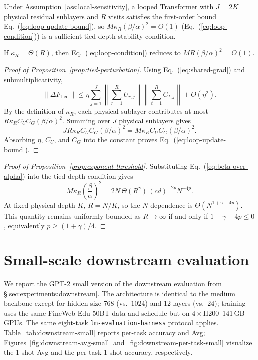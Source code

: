 \documentclass[11pt]{airesearch}
\begin{document}
\begin{proposition}
\label{prop:tied-perturbation}
Under Assumption~\ref{ass:local-sensitivity}, a looped Transformer with
$J=2K$ physical residual sublayers and $R$ visits satisfies the first-order
bound Eq.~(\ref{eq:loop-update-bound}), so
$M\kappa_R(\beta/\alpha)^2=O(1)$ (Eq.~(\ref{eq:loop-condition})) is a sufficient tied-depth stability condition.
\end{proposition}

\begin{corollary}
\label{cor:aligned-loop}
If $\kappa_R=\Theta(R)$, then Eq.~(\ref{eq:loop-condition}) reduces to
$MR(\beta/\alpha)^2 = O(1)$.
\end{corollary}

\begin{proof}[Proof of Proposition~\ref{prop:tied-perturbation}]
Using Eq.~(\ref{eq:shared-grad}) and submultiplicativity,
\[
  \|\Delta F_{\mathrm{tied}}\|
  \le
  \eta\sum_{j=1}^{J}
  \left\|\sum_{r=1}^{R} U_{r,j}\right\|
  \left\|\sum_{t=1}^{R} G_{t,j}\right\|
  +O(\eta^2).
\]
By the definition of $\kappa_R$, each physical sublayer contributes at most
$R\kappa_R C_UC_G(\beta/\alpha)^2$. Summing over $J$ physical sublayers gives
\[
  JR\kappa_R C_UC_G(\beta/\alpha)^2
  =M\kappa_R C_UC_G(\beta/\alpha)^2.
\]
Absorbing $\eta$, $C_U$, and $C_G$ into the constant proves
Eq.~(\ref{eq:loop-update-bound}).
\end{proof}

\begin{proof}[Proof of Proposition~\ref{prop:exponent-threshold}]
Substituting Eq.~(\ref{eq:beta-over-alpha}) into the tied-depth condition gives
\[
  M\kappa_R\left(\frac{\beta}{\alpha}\right)^2
  =2N\,\Theta(R^\gamma)\,(cd)^{-2p}N^{-4p}.
\]
At fixed physical depth $K$, $R=N/K$, so the $N$-dependence is
$\Theta(N^{1+\gamma-4p})$. This quantity remains uniformly bounded as
$R\to\infty$ if and only if $1+\gamma-4p\le0$, equivalently
$p\ge(1+\gamma)/4$.
\end{proof}


\clearpage

\section{Small-scale downstream evaluation}
\label{app:small-downstream}

We report the GPT-2 small version of the downstream
evaluation from \S\ref{sec:experiments:downstream}. The architecture
is identical to the medium backbone except for hidden size $768$
(vs.\ $1024$) and $12$ layers (vs.\ $24$); training uses the same
FineWeb-Edu 50BT data and schedule but on $4\times$H200~141\,GB GPUs.
The same eight-task \texttt{lm-evaluation-harness} protocol applies.
Table~\ref{tab:downstream-small} reports per-task accuracy and Avg;
Figures~\ref{fig:downstream-avg-small}
and~\ref{fig:downstream-per-task-small} visualize the 1-shot Avg and the per-task 1-shot accuracy, respectively.
\end{document}
